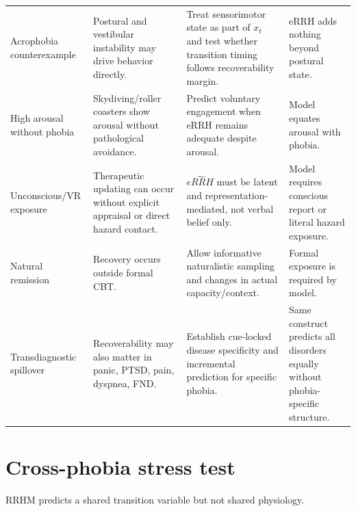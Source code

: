 \documentclass[9pt,twocolumn]{article}
\begin{document}
\begin{table}[t]
\begin{tabularx}{\textwidth}{p{}X X p{}}
Acrophobia counterexample & Postural and vestibular instability may drive behavior directly. & Treat sensorimotor state as part of $x_t$ and test whether transition timing follows recoverability margin. & eRRH adds nothing beyond postural state. \\
High arousal without phobia & Skydiving/roller coasters show arousal without pathological avoidance. & Predict voluntary engagement when eRRH remains adequate despite arousal. & Model equates arousal with phobia. \\
Unconscious/VR exposure & Therapeutic updating can occur without explicit appraisal or direct hazard contact. & $\widehat{eRRH}$ must be latent and representation-mediated, not verbal belief only. & Model requires conscious report or literal hazard exposure. \\
Natural remission & Recovery occurs outside formal CBT. & Allow informative naturalistic sampling and changes in actual capacity/context. & Formal exposure is required by model. \\
Transdiagnostic spillover & Recoverability may also matter in panic, PTSD, pain, dyspnea, FND. & Establish cue-locked disease specificity and incremental prediction for specific phobia. & Same construct predicts all disorders equally without phobia-specific structure. \\
\bottomrule
\end{tabularx}
\end{table}

\section{Cross-phobia stress test}
RRHM predicts a shared transition variable but not shared physiology.
\end{document}
